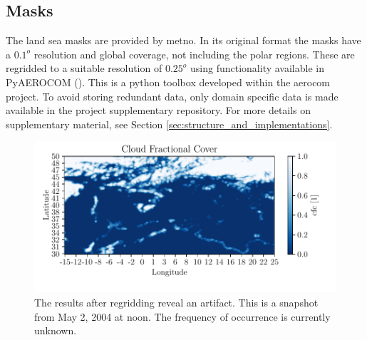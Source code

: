 \subsection{Masks} \label{sec:mask}
The land sea masks are provided by \acrfull{metno}. In its original format the masks have a $0.1^o$ resolution and global coverage, not including the polar regions. These are regridded to a suitable resolution of $0.25^o$ using functionality available in PyAEROCOM (\cite{pyaerocom}). %
This is a python toolbox developed within the \acrfull{aerocom} project. To avoid storing redundant data, only domain specific data is made available in the project supplementary repository. For more details on supplementary material, see Section \ref{sec:structure_and_implementations}.
\begin{figure}
    \centering
    \includegraphics{python_figs/example_artefact.pdf}
    \caption{The results after regridding reveal an artifact. This is a snapshot from May 2, 2004 at noon. The frequency of occurrence is currently unknown.}
    \label{fig:example_artifact}
\end{figure}

